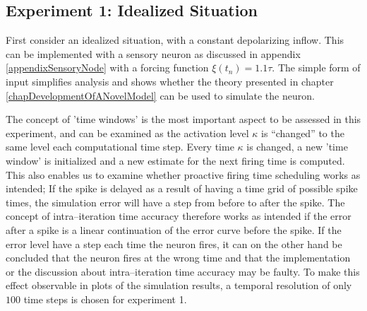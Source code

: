 	\subsection{Experiment 1: Idealized Situation}
	First consider an idealized situation, with a constant depolarizing inflow.
	This can be implemented with a sensory neuron as discussed in appendix \ref{appendixSensoryNode} with a forcing function $\xi(t_n)=1.1 \tau$. 
	The simple form of input simplifies analysis and shows whether the theory presented in chapter \ref{chapDevelopmentOfANovelModel} can be used to simulate the neuron.

	The concept of 'time windows' is the most important aspect to be assessed in this experiment, and can be examined as the activation level $\kappa$ is ``changed'' to the same level each computational time step.
	Every time $\kappa$ is changed, a new 'time window' is initialized and a new estimate for the next firing time is computed.
	This also enables us to examine whether proactive firing time scheduling works as intended;
		If the spike is delayed as a result of having a time grid of possible spike times, the simulation error will have a step from before to after the spike.
	The concept of intra--iteration time accuracy therefore works as intended if the error after a spike is a linear continuation of the error curve before the spike.
	If the error level have a step each time the neuron fires, it can on the other hand be concluded that the neuron fires at the wrong time and that the implementation or the discussion about intra--iteration time accuracy may be faulty.
	To make this effect observable in plots of the simulation results, a temporal resolution of only $100$ time steps is chosen for experiment 1.

